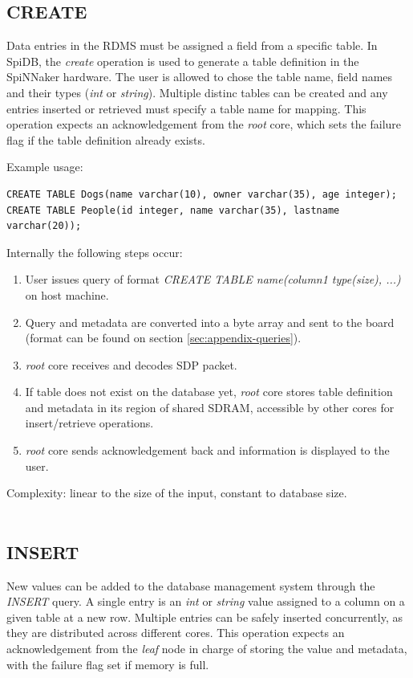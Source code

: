 \subsection{CREATE}
Data entries in the RDMS must be assigned a field from a specific table. In SpiDB, the \textit{create} operation is used to generate a table definition in the SpiNNaker hardware. The user is allowed to chose the table name, field names and their types (\textit{int} or \textit{string}). Multiple distinc tables can be created and any entries inserted or retrieved must specify a table name for mapping. 
This operation expects an acknowledgement from the \textit{root} core, which sets the failure flag if the table definition already exists.

Example usage:
\begin{lstlisting}
CREATE TABLE Dogs(name varchar(10), owner varchar(35), age integer);
CREATE TABLE People(id integer, name varchar(35), lastname varchar(20));
\end{lstlisting}

Internally the following steps occur:
\begin{enumerate}
\item User issues query of format \textit{CREATE TABLE name(column1 type(size), ...)} on host machine.
\item Query and metadata are converted into a byte array and sent to the board (format can be found on section \ref{sec:appendix-queries}).
\item \textit{root} core receives and decodes SDP packet.
\item If table does not exist on the database yet, \textit{root} core stores table definition and metadata in its region of shared SDRAM, accessible by other cores for insert/retrieve operations. 
\item \textit{root} core sends acknowledgement back and information is displayed to the user.
\end{enumerate}

Complexity: linear to the size of the input, constant to database size.\\\\
   
\subsection{INSERT}
New values can be added to the database management system through the \textit{INSERT} query. A single entry is an \textit{int} or \textit{string} value assigned to a column on a given table at a new row. Multiple entries can be safely inserted concurrently, as they are distributed across different cores. This operation expects an acknowledgement from the \textit{leaf} node in charge of storing the value and metadata, with the failure flag set if memory is full.

